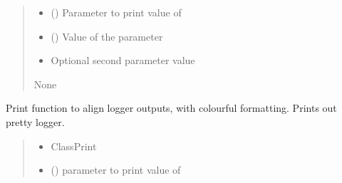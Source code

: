 \documentclass[letterpaper,10pt,english]{sphinxmanual}
\begin{document}
\begin{fulllineitems}
\begin{fulllineitems}
\begin{quote}
\begin{description}
\begin{itemize}
\item {} 
\sphinxAtStartPar
{} () \textendash{} Parameter to print value of

\item {} 
\sphinxAtStartPar
{} () \textendash{} Value of the parameter

\item {} 
\sphinxAtStartPar
{} \textendash{} Optional second parameter value

\end{itemize}

\sphinxAtStartPar
None

\end{description}\end{quote}

\end{fulllineitems}


\begin{fulllineitems}
\label{\detokenize{api/killMS.Parset:killMS.Parset.ClassPrint.ClassPrint.Print2}}
\pysigstartsignatures
{}
\pysigstopsignatures
\sphinxAtStartPar
Print function to align logger outputs, with colourful formatting.
Prints out pretty logger.
\begin{quote}\begin{description}
\begin{itemize}
\item {} 
\sphinxAtStartPar
{} \textendash{} ClassPrint

\item {} 
\sphinxAtStartPar
{} () \textendash{} parameter to print value of


\end{itemize}
\end{description}
\end{quote}
\end{fulllineitems}
\end{fulllineitems}
\end{document}
